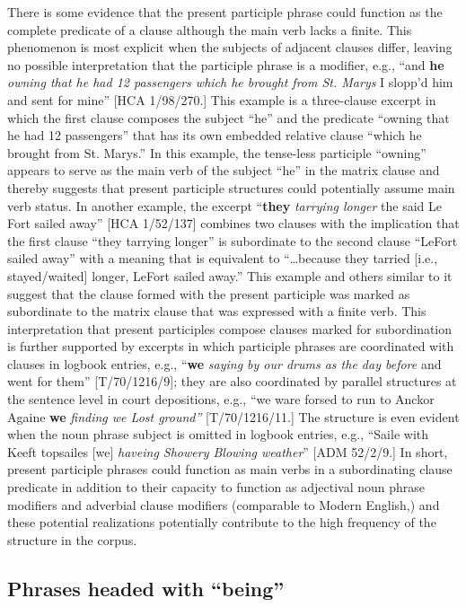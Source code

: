   There is some evidence that the present participle phrase could function as the complete predicate of a clause although the main verb lacks a finite. This phenomenon is most explicit when the subjects of adjacent clauses differ, leaving no possible interpretation that the participle phrase is a modifier, e.g., “and \textbf{he} \textit{owning that he had 12 passengers which he brought from St. Marys} I slopp’d him and sent for mine” [HCA 1/98/270.] This example is a three-clause excerpt in which the first clause composes the subject “he” and the predicate “owning that he had 12 passengers” that has its own embedded relative clause “which he brought from St. Marys.” In this example, the tense-less participle “owning” appears to serve as the main verb of the subject “he” in the matrix clause and thereby suggests that present participle structures could potentially assume main verb status. In another example, the excerpt “\textbf{they} \textit{tarrying longer} the said Le Fort sailed away” [HCA 1/52/137] combines two clauses with the implication that the first clause “they tarrying longer” is subordinate to the second clause “LeFort sailed away” with a meaning that is equivalent to “…because they tarried [i.e., stayed/waited] longer, LeFort sailed away.” This example and others similar to it suggest that the clause formed with the present participle was marked as subordinate to the matrix clause that was expressed with a finite verb. This interpretation that present participles compose clauses marked for subordination is further supported by excerpts in which participle phrases are coordinated with clauses in logbook entries, e.g., “\textbf{we} \textit{saying by our drums as the day before} and went for them” [T/70/1216/9]; they are also coordinated by parallel structures at the sentence level in court depositions, e.g., “we ware forsed to run to Anckor Againe \textbf{we} \textit{finding we Lost ground”} [T/70/1216/11.] The structure is even evident when the noun phrase subject is omitted in logbook entries, e.g., “Saile with Keeft topsailes [we] \textit{haveing Showery Blowing weather}” [ADM 52/2/9.] In short, present participle phrases could function as main verbs in a subordinating clause predicate in addition to their capacity to function as adjectival noun phrase modifiers and adverbial clause modifiers (comparable to Modern English,) and these potential realizations potentially contribute to the high frequency of the structure in the corpus. 

\subsection{{Phrases} {headed} {with} {“being”}}%

